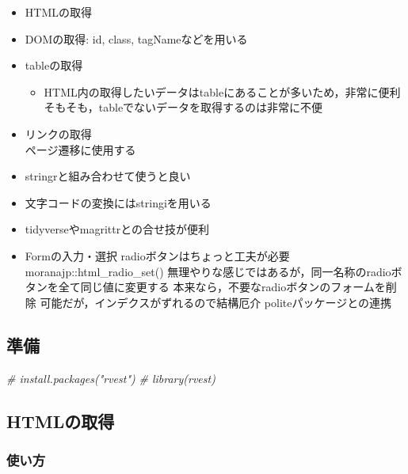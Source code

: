 \documentclass[
]{article}
\newenvironment{Shaded}{\begin{snugshade}}{\end{snugshade}}
\newcommand{\CommentTok}[1]{\textcolor[rgb]{0.56,0.35,0.01}{\textit{#1}}}
\providecommand{\tightlist}{%
  \setlength{\itemsep}{0pt}\setlength{\parskip}{0pt}}
\begin{document}
\begin{itemize}
\tightlist
\item
  HTMLの取得\\
\item
  DOMの取得: id, class, tagNameなどを用いる\\
\item
  tableの取得

  \begin{itemize}
  \tightlist
  \item
    HTML内の取得したいデータはtableにあることが多いため，非常に便利
    そもそも，tableでないデータを取得するのは非常に不便
  \end{itemize}
\item
  リンクの取得\\
  ページ遷移に使用する\\
\item
  stringrと組み合わせて使うと良い\\
\item
  文字コードの変換にはstringiを用いる\\
\item
  tidyverseやmagrittrとの合せ技が便利\\
\item
  Formの入力・選択
  radioボタンはちょっと工夫が必要
  moranajp::html\_radio\_set()
  無理やりな感じではあるが，同一名称のradioボタンを全て同じ値に変更する
  本来なら，不要なradioボタンのフォームを削除
  可能だが，インデクスがずれるので結構厄介
  politeパッケージとの連携
\end{itemize}

\hypertarget{ux6e96ux5099-2}{%
\subsection{準備}\label{ux6e96ux5099-2}}

\begin{Shaded}
\begin{Highlighting}[]
  \CommentTok{\# install.packages("rvest")}
  \CommentTok{\# library(rvest)}
\end{Highlighting}
\end{Shaded}

\hypertarget{htmlux306eux53d6ux5f97}{%
\subsection{HTMLの取得}\label{htmlux306eux53d6ux5f97}}

\hypertarget{ux4f7fux3044ux65b9-3}{%
\subsubsection{使い方}\label{ux4f7fux3044ux65b9-3}}
\end{document}
